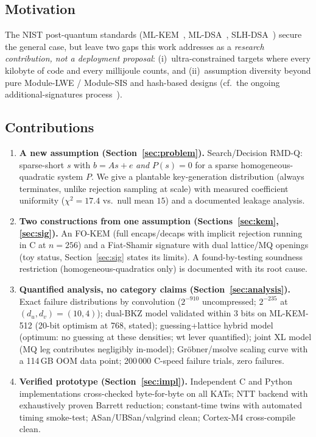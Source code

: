 \documentclass[11pt,a4paper]{article}
\begin{document}
\subsection{Motivation}

The NIST post-quantum standards (ML-KEM~\cite{FIPS203}, ML-DSA~\cite{FIPS204},
SLH-DSA~\cite{FIPS205}) secure the general case, but leave two gaps this
work addresses as a \emph{research contribution, not a deployment proposal}:
(i)~ultra-constrained targets where every kilobyte of code and every
millijoule counts, and (ii)~assumption diversity beyond pure Module-LWE /
Module-SIS and hash-based designs (cf.\ the ongoing additional-signatures
process~\cite{IR8610}).

\subsection{Contributions}

\begin{enumerate}[leftmargin=*]
\item \textbf{A new assumption (Section~\ref{sec:problem}).}
  Search/Decision RMD-Q: sparse-short $s$ with $b=As+e$ \emph{and}
  $P(s)=0$ for a sparse homogeneous-quadratic system $P$.  We give a
  plantable key-generation distribution (always terminates, unlike
  rejection sampling at scale) with measured coefficient uniformity
  ($\chi^2=17.4$ vs.\ null mean $15$) and a documented leakage analysis.
\item \textbf{Two constructions from one assumption (Sections~\ref{sec:kem},
  \ref{sec:sig}).} An FO-KEM (full encaps/decaps with implicit rejection
  running in C at $n=256$) and a Fiat-Shamir signature with dual
  lattice/MQ openings (toy status, Section~\ref{sec:sig} states its limits).
  A found-by-testing soundness restriction (homogeneous-quadratics only)
  is documented with its root cause.
\item \textbf{Quantified analysis, no category claims
  (Section~\ref{sec:analysis}).} Exact failure distributions by convolution
  ($2^{-910}$ uncompressed; $2^{-235}$ at $(d_u,d_v)=(10,4)$); dual-BKZ
  model validated within 3 bits on ML-KEM-512 (20-bit optimism at 768,
  stated); guessing+lattice hybrid model (optimum: no guessing at these
  densities; wt lever quantified); joint XL model (MQ leg contributes
  negligibly in-model); Gr\"obner/msolve scaling curve with a 114\,GB OOM
  data point; 200\,000 C-speed failure trials, zero failures.
\item \textbf{Verified prototype (Section~\ref{sec:impl}).} Independent C
  and Python implementations cross-checked byte-for-byte on all KATs;
  NTT backend with exhaustively proven Barrett reduction; constant-time
  twins with automated timing smoke-test; ASan/UBSan/valgrind clean;
  Cortex-M4 cross-compile clean.
\end{enumerate}
\end{document}

